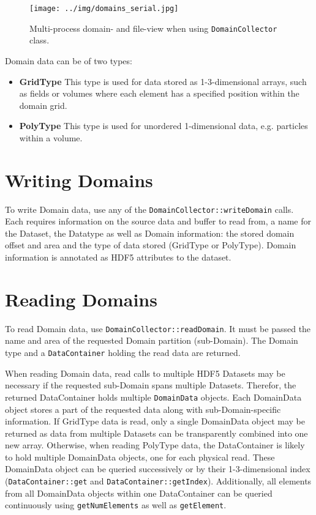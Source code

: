 \documentclass[a4paper,10pt,BCOR12mm]{report}
\newcommand{\code}[1]{\small \texttt{#1}}
\begin{document}
\begin{figure}[hb]
 \texttt{[image: ../img/domains\_serial.jpg]}
 \caption{Multi-process domain- and file-view when using \code{DomainCollector} class.}
\end{figure}

Domain data can be of two types:
\begin{itemize}
	\item \textbf{GridType}
	This type is used for data stored as 1-3-dimensional arrays, such as fields or volumes
	where each element has a specified position within the domain grid.

	\item \textbf{PolyType}
	This type is used for unordered 1-dimensional data, e.g. particles within a volume.
\end{itemize}

\section{Writing Domains}

To write Domain data, use any of the \code{DomainCollector::writeDomain} calls.
Each requires information on the source data and buffer to read from, a name for the Dataset, the Datatype as well as
Domain information: the stored domain offset and area and the type of data stored (GridType or PolyType).
Domain information is annotated as HDF5 attributes to the dataset.

\section{Reading Domains}

To read Domain data, use \code{DomainCollector::readDomain}.
It must be passed the name and area of the requested Domain partition (sub-Domain).
The Domain type and a \code{DataContainer} holding the read data are returned.

When reading Domain data, read calls to multiple HDF5 Datasets may be necessary if the requested
sub-Domain spans multiple Datasets. Therefor, the returned DataContainer holds multiple
\code{DomainData} objects.
Each DomainData object stores a part of the requested data along with sub-Domain-specific information.
If GridType data is read, only a single DomainData object may be returned as data from multiple Datasets can
be transparently combined into one new array.
Otherwise, when reading PolyType data, the DataContainer is likely to hold multiple DomainData objects, one for
each physical read.
These DomainData object can be queried successively or by their 1-3-dimensional index
(\code{DataContainer::get} and \code{DataContainer::getIndex}).
Additionally, all elements from all DomainData objects within one DataContainer can be
queried continuously using \code{getNumElements} as well as
\code{getElement}.
\end{document}
